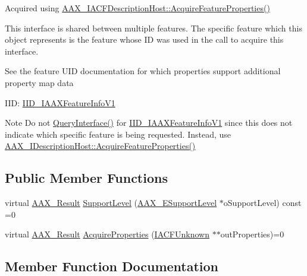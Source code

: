 Acquired using \hyperlink{a00056_ae4b0144bfdfdbd5881150c20eef1c48f}{A\+A\+X\+\_\+\+I\+A\+C\+F\+Description\+Host\+::\+Acquire\+Feature\+Properties()}

This interface is shared between multiple features. The specific feature which this object represents is the feature whose I\+D was used in the call to acquire this interface.

See the feature U\+I\+D documentation for which properties support additional property map data

I\+I\+D\+: \hyperlink{a00299_a4bc11f4b2a3f9c7ca9162c6b3689978e}{I\+I\+D\+\_\+\+I\+A\+A\+X\+Feature\+Info\+V1}

\begin{DoxyNote}{Note}
Do not {\ttfamily \hyperlink{a00146_a8b7f0ae9c78d007ca76aa462ebe53135}{Query\+Interface()}} for \hyperlink{a00299_a4bc11f4b2a3f9c7ca9162c6b3689978e}{I\+I\+D\+\_\+\+I\+A\+A\+X\+Feature\+Info\+V1} since this does not indicate which specific feature is being requested. Instead, use \hyperlink{a00091_aa0d9e27d0207113f98c217d870bfa5e9}{A\+A\+X\+\_\+\+I\+Description\+Host\+::\+Acquire\+Feature\+Properties()} 
\end{DoxyNote}
\subsection*{Public Member Functions}
\begin{DoxyCompactItemize}
\item 
virtual \hyperlink{a00149_a4d8f69a697df7f70c3a8e9b8ee130d2f}{A\+A\+X\+\_\+\+Result} \hyperlink{a00065_a5973ec7e7dbb4cb566df58cfacdfcafd}{Support\+Level} (\hyperlink{a00206_aca7bf42860665d5da66f4ac342e761b3}{A\+A\+X\+\_\+\+E\+Support\+Level} $\ast$o\+Support\+Level) const =0
\item 
virtual \hyperlink{a00149_a4d8f69a697df7f70c3a8e9b8ee130d2f}{A\+A\+X\+\_\+\+Result} \hyperlink{a00065_a6ea3222257cdc9395ad5a766d4130df8}{Acquire\+Properties} (\hyperlink{a00146}{I\+A\+C\+F\+Unknown} $\ast$$\ast$out\+Properties)=0
\end{DoxyCompactItemize}


\subsection{Member Function Documentation}
\hypertarget{a00065_a5973ec7e7dbb4cb566df58cfacdfcafd}{}

